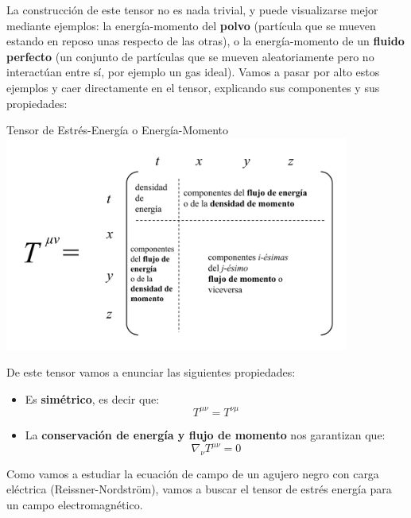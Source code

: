 La construcción de este tensor no es nada trivial, y puede visualizarse mejor mediante ejemplos: la energía-momento del \textbf{polvo} (partícula que se mueven estando en reposo unas respecto de las otras), o la energía-momento de un \textbf{fluido perfecto} (un conjunto de partículas que se mueven aleatoriamente pero no interactúan entre sí, por ejemplo un gas ideal). Vamos a pasar por alto estos ejemplos y caer directamente en el tensor, explicando sus componentes y sus propiedades:
\begin{remarkbox}{Tensor de Estrés-Energía o Energía-Momento}
    \centering
    \includegraphics[width=0.85\textwidth]{Im/tensor.png}
\end{remarkbox}

De este tensor vamos a enunciar las siguientes propiedades:
\begin{itemize}
    \item Es \textbf{simétrico}, es decir que:
    $$T^{\mu\nu}=T^{\nu\mu}$$
    \item La \textbf{conservación de energía y flujo de momento} nos garantizan que:
    $$\nabla_{\nu}T^{\mu\nu}=0$$
\end{itemize}

Como vamos a estudiar la ecuación de campo de un agujero negro con carga eléctrica (Reissner-Nordström), vamos a buscar el tensor de estrés energía para un campo electromagnético.


